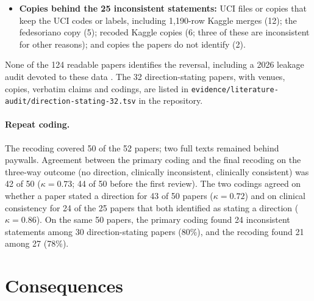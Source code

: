 \documentclass[11pt]{article}
\begin{document}
\begin{itemize}
  \begin{itemize}
  \item Three contradict the paper's own coding table or its own data.
  \item Two appear, from their counts or correlations, to use a 303-row Kaggle copy that shares the Lapp copy's coding and reversed outcome, so the two errors cancel.
  \item One maps codes inconsistently.
  \item One does not identify its copy.
  \end{itemize}
\item \textbf{Copies behind the 25 inconsistent statements:} UCI files or copies that keep the UCI codes or labels, including 1{,}190-row Kaggle merges (12); the fedesoriano copy (5); recoded Kaggle copies (6; three of these are inconsistent for other reasons); and copies the papers do not identify (2).
\end{itemize}
None of the 124 readable papers identifies the reversal, including a 2026 leakage audit devoted to these data \cite{hussain2026}.
The 32 direction-stating papers, with venues, copies, verbatim claims and codings, are listed in \texttt{evidence/literature-audit/direction-stating-32.tsv} in the repository.

\paragraph{Repeat coding.}
The recoding covered 50 of the 52 papers; two full texts remained behind paywalls. Agreement between the primary coding and the final recoding on the three-way outcome (no direction, clinically inconsistent, clinically consistent) was 42 of 50 ($\kappa=0.73$; 44 of 50 before the first review). The two codings agreed on whether a paper stated a direction for 43 of 50 papers ($\kappa=0.72$) and on clinical consistency for 24 of the 25 papers that both identified as stating a direction ($\kappa=0.86$). On the same 50 papers, the primary coding found 24 inconsistent statements among 30 direction-stating papers (80\%), and the recoding found 21 among 27 (78\%). %

\section{Consequences}\label{sec:consequences}
\end{document}
